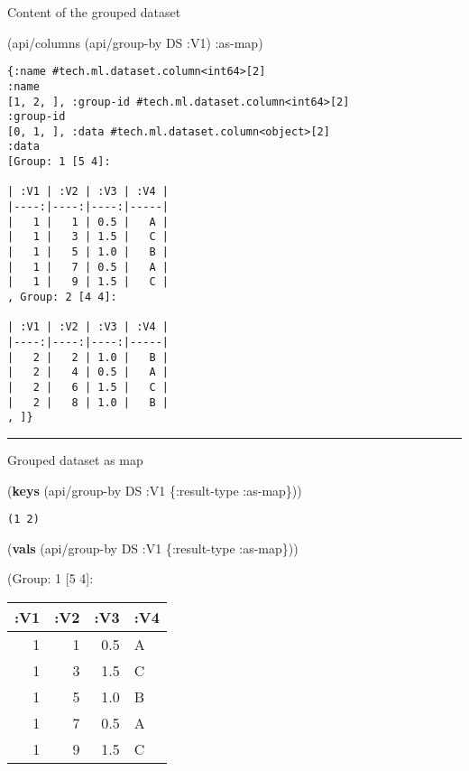 \documentclass[]{article}
\newenvironment{Shaded}{\begin{snugshade}}{\end{snugshade}}
\newcommand{\KeywordTok}[1]{\textcolor[rgb]{0.13,0.29,0.53}{\textbf{#1}}}
\newcommand{\AttributeTok}[1]{\textcolor[rgb]{0.77,0.63,0.00}{#1}}
\newcommand{\NormalTok}[1]{#1}
\begin{document}
Content of the grouped dataset

\begin{Shaded}
\begin{Highlighting}[]
\NormalTok{(api/columns (api/group-by DS }\AttributeTok{:V1}\NormalTok{) }\AttributeTok{:as-map}\NormalTok{)}
\end{Highlighting}
\end{Shaded}

\begin{verbatim}
{:name #tech.ml.dataset.column<int64>[2]
:name
[1, 2, ], :group-id #tech.ml.dataset.column<int64>[2]
:group-id
[0, 1, ], :data #tech.ml.dataset.column<object>[2]
:data
[Group: 1 [5 4]:

| :V1 | :V2 | :V3 | :V4 |
|----:|----:|----:|-----|
|   1 |   1 | 0.5 |   A |
|   1 |   3 | 1.5 |   C |
|   1 |   5 | 1.0 |   B |
|   1 |   7 | 0.5 |   A |
|   1 |   9 | 1.5 |   C |
, Group: 2 [4 4]:

| :V1 | :V2 | :V3 | :V4 |
|----:|----:|----:|-----|
|   2 |   2 | 1.0 |   B |
|   2 |   4 | 0.5 |   A |
|   2 |   6 | 1.5 |   C |
|   2 |   8 | 1.0 |   B |
, ]}
\end{verbatim}

\begin{center}\rule{0.5\linewidth}{0.5pt}\end{center}

Grouped dataset as map

\begin{Shaded}
\begin{Highlighting}[]
\NormalTok{(}\KeywordTok{keys}\NormalTok{ (api/group-by DS }\AttributeTok{:V1}\NormalTok{ \{}\AttributeTok{:result-type} \AttributeTok{:as-map}\NormalTok{\}))}
\end{Highlighting}
\end{Shaded}

\begin{verbatim}
(1 2)
\end{verbatim}

\begin{Shaded}
\begin{Highlighting}[]
\NormalTok{(}\KeywordTok{vals}\NormalTok{ (api/group-by DS }\AttributeTok{:V1}\NormalTok{ \{}\AttributeTok{:result-type} \AttributeTok{:as-map}\NormalTok{\}))}
\end{Highlighting}
\end{Shaded}

(Group: 1 {[}5 4{]}:

\begin{longtable}[]{@{}rrrl@{}}
\toprule
:V1 & :V2 & :V3 & :V4\tabularnewline
\midrule
\endhead
1 & 1 & 0.5 & A\tabularnewline
1 & 3 & 1.5 & C\tabularnewline
1 & 5 & 1.0 & B\tabularnewline
1 & 7 & 0.5 & A\tabularnewline
1 & 9 & 1.5 & C\tabularnewline
\bottomrule
\end{longtable}
\end{document}
